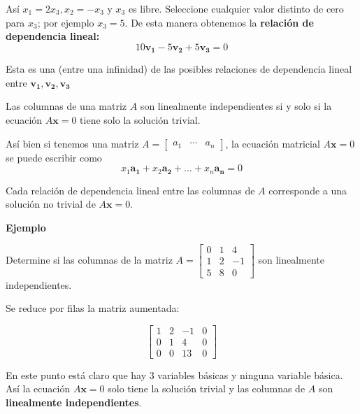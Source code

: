 \documentclass{article}
\begin{document}
Así $x_1 = 2x_3, x_2 = -x_3$ y $x_3$ es libre. Seleccione cualquier valor distinto de cero para $x_3$; por ejemplo $x_3 = 5$. De esta manera obtenemos la \textbf{relación de dependencia lineal:}$$10\mathbf{v_1} - 5\mathbf{v_2} + 5\mathbf{v_3}=0$$

Esta es una (entre una infinidad) de las posibles relaciones de dependencia lineal entre $\mathbf{v_1}, \mathbf{v_2}, \mathbf{v_3}$

\begin{tcolorbox}[colback=blue!10!white,colframe=blue!60!black,title=Columnas de una Matriz]
    Las columnas de una matriz $A$ son linealmente independientes si y solo si la ecuación $A\mathbf{x} = 0$ tiene solo la solución trivial.
\end{tcolorbox}

Así bien si tenemos una matriz $A = \begin{bmatrix} a_1 & \dotsb & a_n \end{bmatrix}$, la ecuación matricial  $A\mathbf{x} = 0$ se puede escribir como $$x_1\mathbf{a_1} + x_2\mathbf{a_2} + ... + x_n\mathbf{a_n} = 0$$

Cada relación de dependencia lineal entre las columnas de $A$ corresponde a una solución no trivial de $A\mathbf{x} = 0$.

\begin{large}
    \textbf{Ejemplo}
\end{large}

Determine si las columnas de la matriz $A = \begin{bmatrix}
    0 & 1 & 4\\
    1 & 2 & -1\\
    5 & 8 & 0
\end{bmatrix}$ son linealmente independientes.

Se reduce por filas la matriz aumentada:

\begin{equation*}
    \left[\begin{array}{rrr|r}
        1 & 2 & -1 & 0 \\
        0 & 1 & 4 & 0 \\
        0 & 0 & 13 & 0
        \end{array}\right]
\end{equation*}

En este punto está claro que hay 3 variables básicas y ninguna variable básica. Así la ecuación $A\mathbf{x} = 0$ solo tiene la solución trivial y las columnas de $A$ son \textbf{linealmente independientes}.
\end{document}
